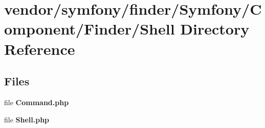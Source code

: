 \section{vendor/symfony/finder/\+Symfony/\+Component/\+Finder/\+Shell Directory Reference}
\label{dir_542955445eaab69a3040efbc9ed4dad1}
\subsection*{Files}
\begin{DoxyCompactItemize}
\item 
file {\bf Command.\+php}
\item 
file {\bf Shell.\+php}
\end{DoxyCompactItemize}
